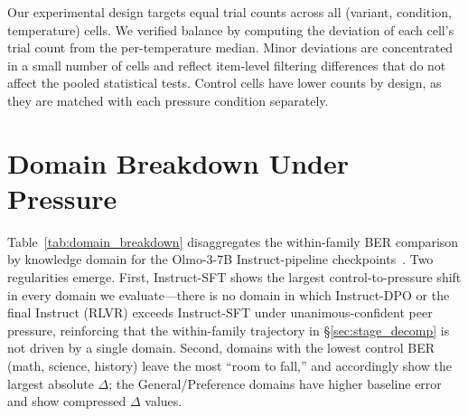 \documentclass{article}
\begin{document}
Our experimental design targets equal trial counts across all (variant, condition, temperature) cells. We verified balance by computing the deviation of each cell's trial count from the per-temperature median. Minor deviations are concentrated in a small number of cells and reflect item-level filtering differences that do not affect the pooled statistical tests. Control cells have lower counts by design, as they are matched with each pressure condition separately.



\section{Domain Breakdown Under Pressure}
\label{app:domains}

Table~\ref{tab:domain_breakdown} disaggregates the within-family BER comparison by knowledge domain for the Olmo-3-7B Instruct-pipeline checkpoints~\citep{olmo3}. Two regularities emerge. First, Instruct-SFT shows the largest control-to-pressure shift in every domain we evaluate---there is no domain in which Instruct-DPO or the final Instruct (RLVR) exceeds Instruct-SFT under unanimous-confident peer pressure, reinforcing that the within-family trajectory in \S\ref{sec:stage_decomp} is not driven by a single domain. Second, domains with the lowest control BER (math, science, history) leave the most ``room to fall,'' and accordingly show the largest absolute $\Delta$; the General/Preference domains have higher baseline error and show compressed $\Delta$ values.
\end{document}
